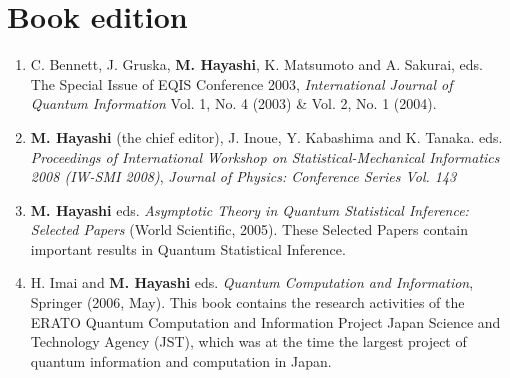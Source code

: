 \documentclass[a4paper,12pt,oneside]{article}
\begin{document}
\section{Book edition}
\begin{enumerate}
\item
C. Bennett, J. Gruska, \textbf{M. Hayashi}, K. Matsumoto and A. Sakurai, eds.
The Special Issue of EQIS Conference 2003, 
{\em International Journal of Quantum Information} 
Vol. 1, No. 4 (2003) \& Vol. 2, No. 1 (2004).

\item
\textbf{M. Hayashi} (the chief editor), J. Inoue, Y. Kabashima and K. Tanaka.
eds.
{\em Proceedings of International Workshop on Statistical-Mechanical Informatics 2008 (IW-SMI 2008)},
{\em Journal of Physics: Conference Series Vol. 143} 

\item
\textbf{M. Hayashi} eds.
{\em Asymptotic Theory in Quantum Statistical Inference: Selected Papers} (World Scientific, 2005).
These Selected Papers contain important results in Quantum Statistical Inference.

\item
H. Imai and \textbf{M. Hayashi} eds.
{\em Quantum Computation and Information}, Springer (2006, May).
This book contains the research activities of
the ERATO Quantum Computation and Information Project 
Japan Science and Technology Agency (JST), which was at the time the largest project of quantum information and computation in Japan.%
\end{enumerate}
\end{document}

